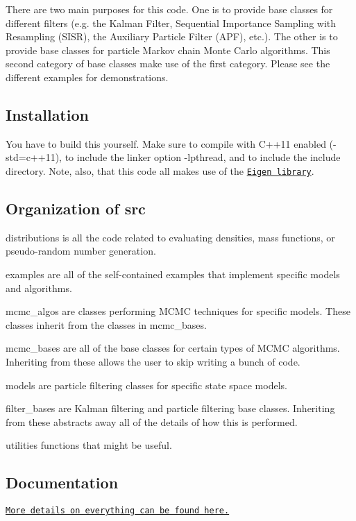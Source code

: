There are two main purposes for this code. One is to provide base classes for different filters (e.\+g. the Kalman Filter, Sequential Importance Sampling with Resampling (S\+I\+SR), the Auxiliary Particle Filter (A\+PF), etc.). The other is to provide base classes for particle Markov chain Monte Carlo algorithms. This second category of base classes make use of the first category. Please see the different examples for demonstrations.

\subsection*{Installation}

You have to build this yourself. Make sure to compile with C++11 enabled ({\ttfamily -\/std=c++11}), to include the linker option {\ttfamily -\/lpthread}, and to include the {\ttfamily include} directory. Note, also, that this code all makes use of the \href{http://eigen.tuxfamily.org/}{\tt Eigen library}.

\subsection*{Organization of {\ttfamily src}}


\begin{DoxyEnumerate}
\item {\ttfamily distributions} is all the code related to evaluating densities, mass functions, or pseudo-\/random number generation.
\item {\ttfamily examples} are all of the self-\/contained examples that implement specific models and algorithms.
\item {\ttfamily mcmc\+\_\+algos} are classes performing M\+C\+MC techniques for specific models. These classes inherit from the classes in {\ttfamily mcmc\+\_\+bases}.
\item {\ttfamily mcmc\+\_\+bases} are all of the base classes for certain types of M\+C\+MC algorithms. Inheriting from these allows the user to skip writing a bunch of code.
\item {\ttfamily models} are particle filtering classes for specific state space models.
\item {\ttfamily filter\+\_\+bases} are Kalman filtering and particle filtering base classes. Inheriting from these abstracts away all of the details of how this is performed.
\item {\ttfamily utilities} functions that might be useful.
\end{DoxyEnumerate}

\subsection*{Documentation}

\href{https://tbrown122387.github.io/ssm/}{\tt More details on everything can be found here.} 